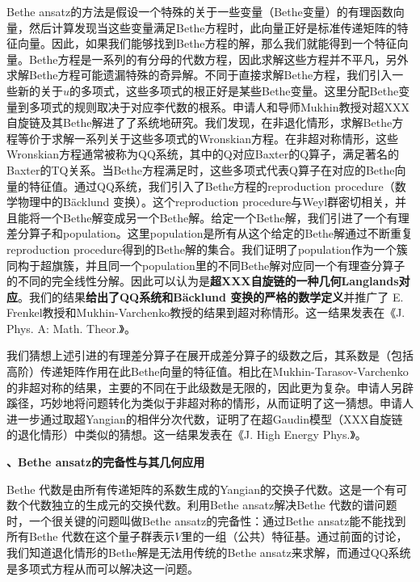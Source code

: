 \documentclass[12pt,UTF8,AutoFakeBold=4,a4paper]{ctexart}
\begin{document}
Bethe ansatz的方法是假设一个特殊的关于一些变量（Bethe变量）的有理函数向量，然后计算发现当这些变量满足Bethe方程时，此向量正好是标准传递矩阵的特征向量。因此，如果我们能够找到Bethe方程的解，那么我们就能得到一个特征向量。Bethe方程是一系列的有分母的代数方程，因此求解这些方程并不平凡，另外求解Bethe方程可能遗漏特殊的奇异解。不同于直接求解Bethe方程，我们引入一些新的关于$u$的多项式，这些多项式的根正好是某些Bethe变量。这里分配Bethe变量到多项式的规则取决于对应李代数的根系。申请人和导师Mukhin教授对超XXX自旋链及其Bethe解进了了系统地研究。我们发现，在非退化情形，求解Bethe方程等价于求解一系列关于这些多项式的Wronskian方程。在非超对称情形，这些Wronskian方程通常被称为QQ系统，其中的Q对应Baxter的Q算子，满足著名的Baxter的TQ关系。当Bethe方程满足时，这些多项式代表Q算子在对应的Bethe向量的特征值。通过QQ系统，我们引入了Bethe方程的reproduction procedure（数学物理中的B\"{a}cklund 变换）。这个reproduction procedure与Weyl群密切相关，并且能将一个Bethe解变成另一个Bethe解。给定一个Bethe解，我们引进了一个有理差分算子和population。这里population是所有从这个给定的Bethe解通过不断重复reproduction procedure得到的Bethe解的集合。我们证明了population作为一个簇同构于超旗簇，并且同一个population里的不同Bethe解对应同一个有理查分算子的不同的完全线性分解。因此可以认为是\textbf{超XXX自旋链的一种几何Langlands对应}。我们的结果\textbf{给出了QQ系统和B\"{a}cklund 变换的严格的数学定义}并推广了 E. Frenkel教授和Mukhin-Varchenko教授的结果到超对称情形。这一结果发表在《J. Phys. A: Math. Theor.》。

我们猜想上述引进的有理差分算子在展开成差分算子的级数之后，其系数是（包括高阶）传递矩阵作用在此Bethe向量的特征值。相比在Mukhin-Tarasov-Varchenko的非超对称的结果，主要的不同在于此级数是无限的，因此更为复杂。申请人另辟蹊径，巧妙地将问题转化为类似于非超对称的情形，从而证明了这一猜想。申请人进一步通过取超Yangian的相伴分次代数，证明了在超Gaudin模型（XXX自旋链的退化情形）中类似的猜想。这一结果发表在《J. High Energy Phys.》。



\medskip

\textbf{、Bethe ansatz的完备性与其几何应用}

Bethe 代数是由所有传递矩阵的系数生成的Yangian的交换子代数。这是一个有可数个代数独立的生成元的交换代数。利用Bethe ansatz解决Bethe 代数的谱问题时，一个很关键的问题叫做Bethe ansatz的完备性：通过Bethe ansatz能不能找到所有Bethe 代数在这个量子群表示$V$里的一组（公共）特征基。通过前面的讨论，我们知道退化情形的Bethe解是无法用传统的Bethe ansatz来求解，而通过QQ系统是多项式方程从而可以解决这一问题。
\end{document}

